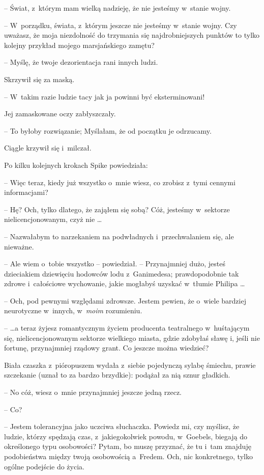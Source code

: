 \documentclass[oneside,polish,11pt,rmheadings]{mwbk}
\begin{document}
-- Świat, z~którym mam wielką nadzieję, że nie jesteśmy w~stanie wojny. 

-- W~porządku, świata, z~którym jeszcze nie jesteśmy w~stanie wojny. Czy uważasz, że moja niezdolność do trzymania się najdrobniejszych punktów to tylko kolejny przykład mojego marsjańskiego zamętu? 

-- Myślę, że twoje dezorientacja rani innych ludzi. 

Skrzywił się za maską. 

-- W~takim razie ludzie tacy jak ja powinni być eksterminowani! 

Jej zamaskowane oczy zabłyszczały. 

-- To byłoby rozwiązanie; Myślałam, że od początku je odrzucamy. 

Ciągle krzywił się i~milczał. 

Po kilku kolejnych krokach Spike powiedziała: 

-- Więc teraz, kiedy już wszystko o~mnie wiesz, co zrobisz z~tymi cennymi informacjami? 

-- Hę? Och, tylko dlatego, że zająłem się sobą? Cóż, jesteśmy w~sektorze nielicencjonowanym, czyż nie \ldots  

-- Nazwałabym to narzekaniem na podwładnych i~przechwalaniem się, ale nieważne. 

-- Ale wiem o~tobie wszystko -- powiedział. -- Przynajmniej dużo, jesteś dzieciakiem dziewięciu hodowców lodu z~Ganimedesa; prawdopodobnie tak zdrowe i~całościowe wychowanie, jakie mogłabyś uzyskać w~tłumie Philipa \ldots  

-- Och, pod pewnymi względami zdrowsze. Jestem pewien, że o~wiele bardziej neurotyczne w~innych, w~\textit{moim }rozumieniu. 

--  \ldots a teraz żyjesz romantycznym życiem producenta teatralnego w~huśtającym się, nielicencjonowanym sektorze wielkiego miasta, gdzie zdobyłaś sławę i, jeśli nie fortunę, przynajmniej rządowy grant. Co jeszcze można wiedzieć? 

Biała czaszka z~pióropuszem wydała z~siebie pojedynczą sylabę śmiechu, prawie szczekanie (uznał to za bardzo brzydkie): podążał za nią sznur gładkich.  

-- No cóż, wiesz o~mnie przynajmniej jeszcze jedną rzecz. 

-- Co? 

-- Jestem tolerancyjna jako uczciwa słuchaczka. Powiedz mi, czy myślisz, że ludzie, którzy spędzają czas, z~jakiegokolwiek powodu, w~Goebels, biegają do określonego typu osobowości? Pytam, bo muszę przyznać, że tu i~tam znajduję podobieństwa między twoją osobowością a~Fredem. Och, nic konkretnego, tylko ogólne podejście do życia. 
\end{document}
